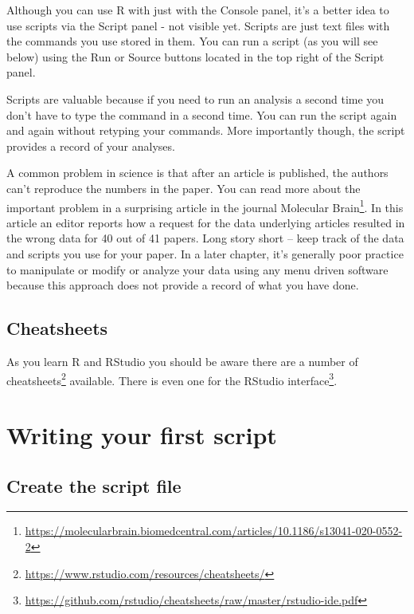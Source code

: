 \documentclass[
]{krantz}
\renewcommand{\href}[2]{#2\footnote{\url{#1}}}
\begin{document}
Although you can use R with just with the Console panel, it's a better idea to use scripts via the Script panel - not visible yet. Scripts are just text files with the commands you use stored in them. You can run a script (as you will see below) using the Run or Source buttons located in the top right of the Script panel.

Scripts are valuable because if you need to run an analysis a second time you don't have to type the command in a second time. You can run the script again and again without retyping your commands. More importantly though, the script provides a record of your analyses.

A common problem in science is that after an article is published, the authors can't reproduce the numbers in the paper. You can read more about the important problem in a surprising article in the journal \href{https://molecularbrain.biomedcentral.com/articles/10.1186/s13041-020-0552-2}{Molecular Brain}. In this article an editor reports how a request for the data underlying articles resulted in the wrong data for 40 out of 41 papers. Long story short -- keep track of the data and scripts you use for your paper. In a later chapter, it's generally poor practice to manipulate or modify or analyze your data using any menu driven software because this approach does not provide a record of what you have done.

\hypertarget{cheatsheets}{%
\subsection{Cheatsheets}\label{cheatsheets}}

As you learn R and RStudio you should be aware there are a number of \href{https://www.rstudio.com/resources/cheatsheets/}{cheatsheets} available. There is even one for the \href{https://github.com/rstudio/cheatsheets/raw/master/rstudio-ide.pdf}{RStudio interface}.

\hypertarget{writing-your-first-script}{%
\section{Writing your first script}\label{writing-your-first-script}}

\hypertarget{create-the-script-file}{%
\subsection{Create the script file}\label{create-the-script-file}}
\end{document}
